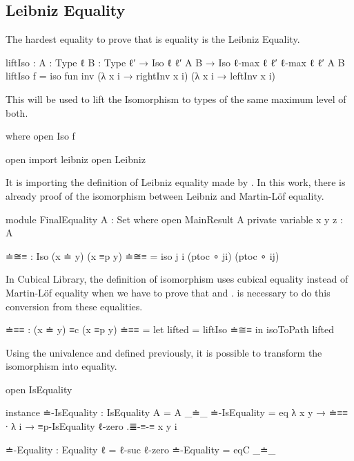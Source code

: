 \documentclass{article}
\begin{document}
\subsection{Leibniz Equality}

The hardest equality to prove that is equality is the Leibniz Equality.

\begin{code}
liftIso : {A : Type ℓ} {B : Type ℓ′}
  → Iso {ℓ} {ℓ′} A B → Iso {ℓ-max ℓ ℓ′} {ℓ-max ℓ ℓ′} A B
liftIso f = iso fun inv
  (λ x i → rightInv x i) (λ x i → leftInv x i)
\end{code}

This  will be used to lift the Isomorphism to types of the same maximum level of both.

\begin{code}
  where open Iso f

open import leibniz
open Leibniz
\end{code}

It is importing the definition of Leibniz equality made by \cite{abel2020leibniz}.
In this work, there is already proof of the isomorphism between Leibniz and Martin-Löf equality.

\begin{code}
module FinalEquality {A : Set} where
  open MainResult A
  private variable
    x y z : A

  ≐≅≡ : Iso (x ≐ y) (x ≡p y)
  ≐≅≡ = iso j i (ptoc ∘ ji) (ptoc ∘ ij)
\end{code}

In Cubical Library, the definition of isomorphism uses cubical equality instead of Martin-Löf equality
when we have to prove that  and .
 is necessary to do this conversion from these equalities.

\begin{code}
  ≐≡≡ : (x ≐ y) ≡c (x ≡p y)
  ≐≡≡ = let lifted = liftIso ≐≅≡  in isoToPath lifted
\end{code}

Using the univalence and  defined previously, it is possible to transform the isomorphism
into equality.

\begin{code}
  open IsEquality

  instance
    ≐-IsEquality : IsEquality {A = A} _≐_
    ≐-IsEquality = eq λ {x} {y} → ≐≡≡ ∙
      λ i → ≡p-IsEquality {ℓ-zero} .≣-≡-≡ {x} {y} i

  ≐-Equality : Equality {ℓ = ℓ-suc ℓ-zero}
  ≐-Equality = eqC _≐_
\end{code}
\end{document}
